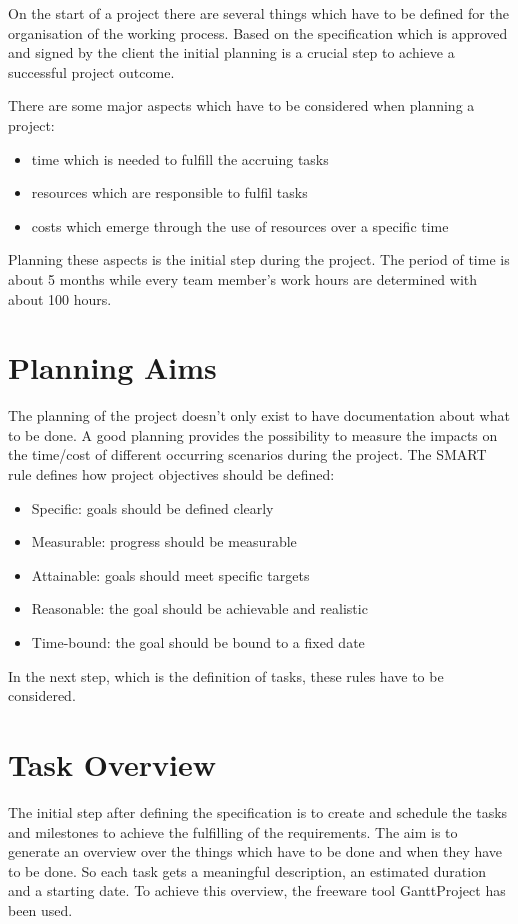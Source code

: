 On the start of a project there are several things which have to be defined for
the organisation of the working process. Based on the specification which is
approved and signed by the client the initial planning is a crucial step to
achieve a successful project outcome. 

There are some major aspects which have to be considered when planning a
project:

\begin{itemize}
\item time which is needed to fulfill the accruing tasks
\item resources which are responsible to fulfil tasks
\item costs which emerge through the use of resources over a specific time
\end{itemize}

Planning these aspects is the initial step during the project. The period of
time is about 5 months while every team member's work hours are determined with
about 100 hours.

\section{Planning Aims}

The planning of the project doesn't only exist to have documentation about what
to be done. A good planning provides the possibility to measure the impacts on
the time/cost of different occurring scenarios during the project. The SMART
rule defines how project objectives should be defined:

\begin{itemize}
\item Specific: goals should be defined clearly
\item Measurable: progress should be measurable
\item Attainable: goals should meet specific targets 
\item Reasonable: the goal should be achievable and realistic
\item Time-bound: the goal should be bound to a fixed date 
\end{itemize}

In the next step, which is the definition of tasks, these rules have to be
considered. 

\section{Task Overview}
The initial step after defining the specification is to create and schedule the
tasks and milestones to achieve the fulfilling of the requirements. The aim is
to generate an overview over the things which have to be done and when they have
to be done. So each task gets a meaningful description, an estimated duration
and a starting date. To achieve this overview, the freeware tool GanttProject
has been used.

